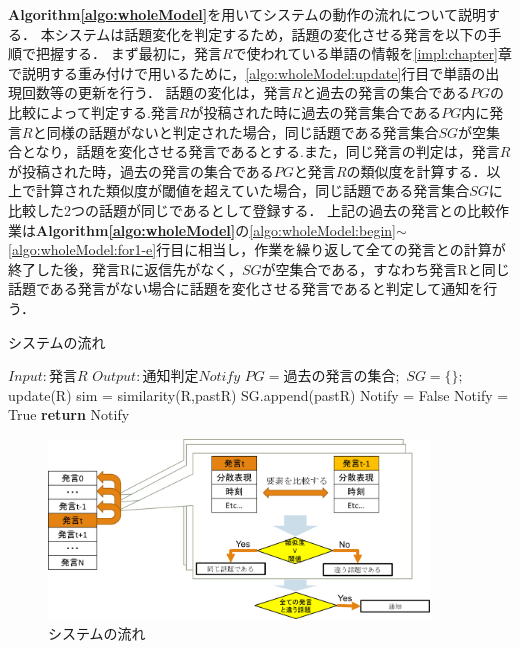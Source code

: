\textbf{Algorithm\ref{algo:wholeModel}}を用いてシステムの動作の流れについて説明する．
本システムは話題変化を判定するため，話題の変化させる発言を以下の手順で把握する．
まず最初に，発言$R$で使われている単語の情報を\ref{impl:chapter}章で説明する重み付けで用いるために，\ref{algo:wholeModel:update}行目で単語の出現回数等の更新を行う．
話題の変化は，発言$R$と過去の発言の集合である$PG$の比較によって判定する.発言$R$が投稿された時に過去の発言集合である$PG$内に発言$R$と同様の話題がないと判定された場合，同じ話題である発言集合$SG$が空集合となり，話題を変化させる発言であるとする.また，同じ発言の判定は，発言$R$が投稿された時，過去の発言の集合である$PG$と発言$R$の類似度を計算する．以上で計算された類似度が閾値を超えていた場合，同じ話題である発言集合$SG$に比較した2つの話題が同じであるとして登録する．
上記の過去の発言との比較作業は\textbf{Algorithm\ref{algo:wholeModel}}の\ref{algo:wholeModel:begin}$\sim$\ref{algo:wholeModel:for1-e}行目に相当し，作業を繰り返して全ての発言との計算が終了した後，発言Rに返信先がなく，$SG$が空集合である，すなわち発言Rと同じ話題である発言がない場合に話題を変化させる発言であると判定して通知を行う．
\begin{algorithm}
\caption{システムの流れ} \label{algo:wholeModel}
\begin{algorithmic}[1]
\State $Input:  発言R$
\State $Output: 通知判定Notify$
\State $PG = 過去の発言の集合;$%
	\State $SG = \{\};$\label{algo:wholeModel:begin}%
	\State update(R)\label{algo:wholeModel:update}
	 \label{algo:wholeModel:for1-b}
	 	\State sim = similarity(R,pastR)
			\State SG.append(pastR)
		\EndIf
	 \EndFor\label{algo:wholeModel:for1-e}
	 \State Notify = False
		\State Notify = True
	\EndIf
	\State \textbf{return} Notify
\EndProcedure
\end{algorithmic}
\end{algorithm}
\begin{figure}[htbp]
 \begin{center}
  \includegraphics[width=0.9\textwidth]{../images/3.The_Model/WholeModel.png}
  \caption{システムの流れ}
  \label{Fig:wholeModel}
  \vspace{-10pt}
 \end{center}
\end{figure}

